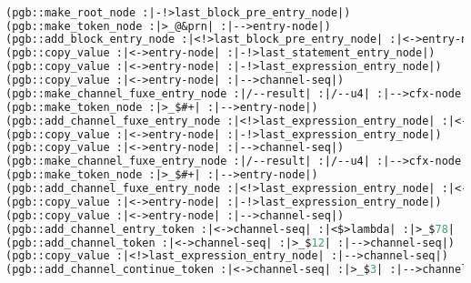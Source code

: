 \begin{lstlisting}[language = lisp, numbers = none, escapechar = !,
    basicstyle = \ttfamily\bfseries\scriptsize, linewidth = .9\linewidth] 

(pgb::make_root_node :|-!>last_block_pre_entry_node|)
(pgb::make_token_node :|>_@&prn| :|-->entry-node|)
(pgb::add_block_entry_node :|<!>last_block_pre_entry_node| :|<->entry-node|)
(pgb::copy_value :|<->entry-node| :|-!>last_statement_entry_node|)
(pgb::copy_value :|<->entry-node| :|-!>last_expression_entry_node|)
(pgb::copy_value :|<->entry-node| :|-->channel-seq|)
(pgb::make_channel_fuxe_entry_node :|/--result| :|/--u4| :|-->cfx-node|)
(pgb::make_token_node :|>_$#+| :|-->entry-node|)
(pgb::add_channel_fuxe_entry_node :|<!>last_expression_entry_node| :|<->entry-node| :|/--lambda| :|<->cfx-node|)
(pgb::copy_value :|<->entry-node| :|-!>last_expression_entry_node|)
(pgb::copy_value :|<->entry-node| :|-->channel-seq|)
(pgb::make_channel_fuxe_entry_node :|/--result| :|/--u4| :|-->cfx-node|)
(pgb::make_token_node :|>_$#+| :|-->entry-node|)
(pgb::add_channel_fuxe_entry_node :|<!>last_expression_entry_node| :|<->entry-node| :|/--lambda| :|<->cfx-node|)
(pgb::copy_value :|<->entry-node| :|-!>last_expression_entry_node|)
(pgb::copy_value :|<->entry-node| :|-->channel-seq|)
(pgb::add_channel_entry_token :|<->channel-seq| :|<$>lambda| :|>_$78| :|-->channel-seq|)
(pgb::add_channel_token :|<->channel-seq| :|>_$12| :|-->channel-seq|)
(pgb::copy_value :|<!>last_expression_entry_node| :|-->channel-seq|)
(pgb::add_channel_continue_token :|<->channel-seq| :|>_$3| :|-->channel-seq|)

\end{lstlisting}
